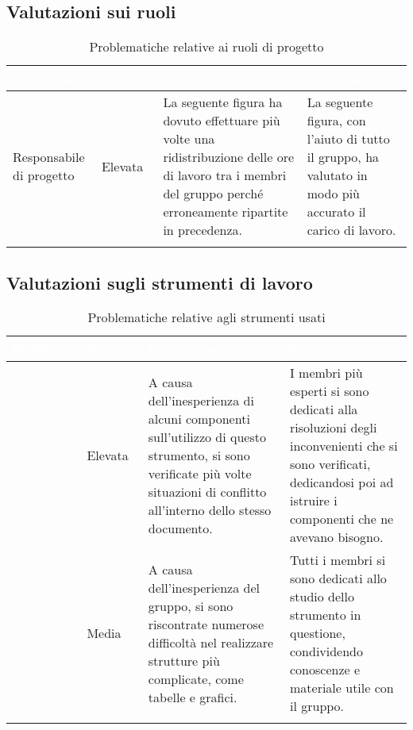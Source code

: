 \subsection{Valutazioni sui ruoli}

\renewcommand{\arraystretch}{1.5}
\centering
\begin{longtable}{C{2.5cm} C{2.5cm} C{6cm} C{5cm}}
\textcolor{white}{\textbf{Problema}} &
\textcolor{white}{\textbf{Gravità}} &
\textcolor{white}{\textbf{Descrizione}} &	
\textcolor{white}{\textbf{Soluzione}} \\	
\endhead

Responsabile di progetto & Elevata & 
La seguente figura ha dovuto effettuare più volte una ridistribuzione delle ore di lavoro tra i membri del gruppo perché erroneamente ripartite in precedenza. &
La seguente figura, con l'aiuto di tutto il gruppo, ha valutato in modo più accurato il carico di lavoro. \\

 \caption{Problematiche relative ai ruoli di progetto}
\end{longtable}

\subsection{Valutazioni sugli strumenti di lavoro}

\renewcommand{\arraystretch}{1.5}
\centering
\begin{longtable}{C{2.5cm} C{2.5cm} C{6cm} C{5cm}}
\textcolor{white}{\textbf{Problema}} &
\textcolor{white}{\textbf{Gravità}} &
\textcolor{white}{\textbf{Descrizione}} &	
\textcolor{white}{\textbf{Soluzione}} \\	
\endhead

 & Elevata & 
A causa dell'inesperienza di alcuni componenti sull'utilizzo di questo strumento, si sono verificate più volte situazioni di conflitto all'interno dello stesso documento. &
I membri più esperti si sono dedicati alla risoluzioni degli inconvenienti che si sono verificati, dedicandosi poi ad istruire i componenti che ne avevano bisogno.  \\

 & Media & 
A causa dell'inesperienza del gruppo, si sono riscontrate numerose difficoltà nel realizzare strutture più complicate, come tabelle e grafici. &
Tutti i membri si sono dedicati allo studio dello strumento in questione, condividendo conoscenze e materiale utile con il gruppo.  \\

 \caption{Problematiche relative agli strumenti usati}
\end{longtable}